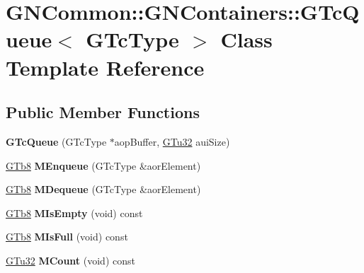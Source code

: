 \hypertarget{class_g_n_common_1_1_g_n_containers_1_1_g_tc_queue}{}\section{G\+N\+Common\+:\+:G\+N\+Containers\+:\+:G\+Tc\+Queue$<$ G\+Tc\+Type $>$ Class Template Reference}
\label{class_g_n_common_1_1_g_n_containers_1_1_g_tc_queue}
\subsection*{Public Member Functions}
\begin{DoxyCompactItemize}
\item 
\mbox{\label{class_g_n_common_1_1_g_n_containers_1_1_g_tc_queue_a4b1733acf84dfb05e42cca118191b868}} 
{\bfseries G\+Tc\+Queue} (G\+Tc\+Type $\ast$aop\+Buffer, \mbox{\hyperlink{namespace_g_n_common_ae5485474bc8f23e462e920a17b377b53}{G\+Tu32}} aui\+Size)
\item 
\mbox{\label{class_g_n_common_1_1_g_n_containers_1_1_g_tc_queue_a94c6227e8ea1485c2ec6bd9b89dd4003}} 
\mbox{\hyperlink{namespace_g_n_common_a6b5283329f609e2175dd0c91fc1520ba}{G\+Tb8}} {\bfseries M\+Enqueue} (G\+Tc\+Type \&aor\+Element)
\item 
\mbox{\label{class_g_n_common_1_1_g_n_containers_1_1_g_tc_queue_a9e378ccbf4b0529207bc941ec2ee0759}} 
\mbox{\hyperlink{namespace_g_n_common_a6b5283329f609e2175dd0c91fc1520ba}{G\+Tb8}} {\bfseries M\+Dequeue} (G\+Tc\+Type \&aor\+Element)
\item 
\mbox{\label{class_g_n_common_1_1_g_n_containers_1_1_g_tc_queue_afdad24729246ccb674920409418519b3}} 
\mbox{\hyperlink{namespace_g_n_common_a6b5283329f609e2175dd0c91fc1520ba}{G\+Tb8}} {\bfseries M\+Is\+Empty} (void) const
\item 
\mbox{\label{class_g_n_common_1_1_g_n_containers_1_1_g_tc_queue_af576448fe19349c14da79fd10e17a993}} 
\mbox{\hyperlink{namespace_g_n_common_a6b5283329f609e2175dd0c91fc1520ba}{G\+Tb8}} {\bfseries M\+Is\+Full} (void) const
\item 
\mbox{\label{class_g_n_common_1_1_g_n_containers_1_1_g_tc_queue_a2678976802edc3b05226badac6841d87}} 
\mbox{\hyperlink{namespace_g_n_common_ae5485474bc8f23e462e920a17b377b53}{G\+Tu32}} {\bfseries M\+Count} (void) const
\end{DoxyCompactItemize}



